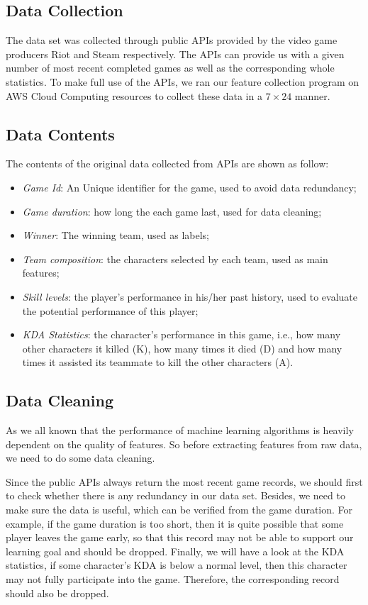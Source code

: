 \documentclass{article} %
\begin{document}
\subsection{Data Collection}

The data set was collected through public APIs provided by the video game producers Riot and Steam respectively. The APIs can provide us with a given number of most recent completed games as well as the corresponding whole statistics. To make full use of the APIs, we ran our feature collection program on AWS Cloud Computing resources to collect these data in a $7\times24$ manner.


\subsection{Data Contents}

The contents of the original data collected from APIs are shown as follow:


\begin{itemize}
\item \textit{Game Id}: An Unique identifier for the game, used to avoid data redundancy;
\item \textit{Game duration}: how long the each game last, used for data cleaning;
\item \textit{Winner}: The winning team, used as labels;
\item \textit{Team composition}: the characters selected by each team, used as main features;
\item \textit{Skill levels}: the player's performance in his/her past history, used to evaluate the potential performance of this player;
\item \textit{KDA Statistics}: the character's performance in this game, i.e., how many other characters it killed (K), how many times it died (D) and how many times it assisted its teammate to kill the other characters (A).
\end{itemize}

\subsection{Data Cleaning}

As we all known that the performance of machine learning algorithms is heavily dependent on the quality of features. So before extracting features from raw data, we need to do some data cleaning.

Since the public APIs always return the most recent game records, we should first to check whether there is any redundancy in our data set. Besides, we need to make sure the data is useful, which can be verified from the game duration. For example, if the game duration is too short, then it is quite possible that some player leaves the game early, so that this record may not be able to support our learning goal and should be dropped. Finally, we will have a look at the KDA statistics, if some character's KDA is below a normal level, then this character may not fully participate into the game. Therefore, the corresponding record should also be dropped.
\end{document}
